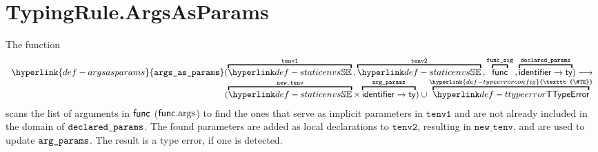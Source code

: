 \documentclass{book}
\newcommand\TypeErrorConfig[0]{\hyperlink{def-typeerrorconfig}{\texttt{\#TE}}}
\newcommand\argsasparams[0]{\hyperlink{def-argsasparams}{\texttt{args\_as\_params}}}
\newcommand\newtenv[0]{\texttt{new\_tenv}}
\newcommand\tenvone[0]{\texttt{tenv1}}
\newcommand\tenvtwo[0]{\texttt{tenv2}}
\begin{document}
\section{TypingRule.ArgsAsParams \label{sec:TypingRule.ArgsAsParams}}
\hypertarget{def-argsasparams}{}
The function
\[
\begin{array}{r}
\argsasparams(
  \overname{\staticenvs}{\tenvone} \aslsep
  \overname{\staticenvs}{\tenvtwo} \aslsep
  \overname{\func}{\funcsig} \aslsep
  \overname{\identifier\rightarrow\ty}{\declaredparams}
  )
\aslto \\
(\overname{\staticenvs}{\newtenv} \times \overname{\identifier\rightarrow\ty}{\argparams})
\cup \overname{\TTypeError}{\TypeErrorConfig}
\end{array}
\]
scans the list of arguments in $\textsf{func}$ ($\textsf{func}.\text{args}$) to find the ones that serve as
implicit parameters in $\tenvone$ and are not already included in the domain of $\texttt{declared\_params}$.
The found parameters are added as local declarations to $\tenvtwo$, resulting in $\newtenv$,
and are used to update $\texttt{arg\_params}$.
The result is a type error, if one is detected.
\end{document}
